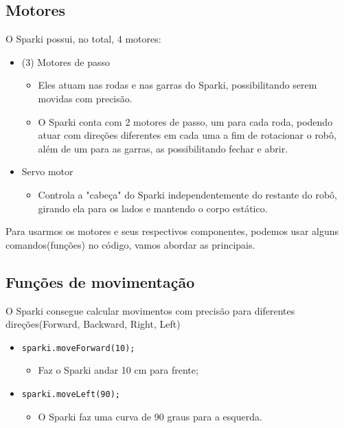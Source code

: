 \documentclass[conference]{IEEEtran}
\begin{document}
\subsection{Motores}
O Sparki possui, no total, 4 motores:
\begin{itemize}
    \item  (3) Motores de passo
    \begin{itemize}
        \item Eles atuam nas rodas e nas garras do Sparki, possibilitando serem movidas com precisão.
        \item O Sparki conta com 2 motores de passo, um para cada roda, podendo atuar com direções diferentes em cada uma a fim de rotacionar o robô, além de um para as garras, as possibilitando fechar e abrir.
        
    \end{itemize}
    \item Servo motor
    \begin{itemize}
        \item Controla a "cabeça" do Sparki independentemente do restante do robô, girando ela para os lados e mantendo o corpo estático.
    \end{itemize}
\end{itemize}
\vspace{0.2cm}
Para usarmos os motores e seus respectivos componentes, podemos usar alguns comandos(funções) no código, vamos abordar as principais.
\subsection{Funções de movimentação}
O Sparki consegue calcular movimentos com precisão para diferentes direções(Forward, Backward, Right, Left)

\begin{itemize}
    \item \texttt{sparki.moveForward(10);}
    \begin{itemize}
        \item Faz o Sparki andar 10 cm para frente;
    \end{itemize}
    \item \texttt{sparki.moveLeft(90);}
    \begin{itemize}
        \item O Sparki faz uma curva de 90 graus para a esquerda.
    \end{itemize}
\end{itemize}
\end{document}

